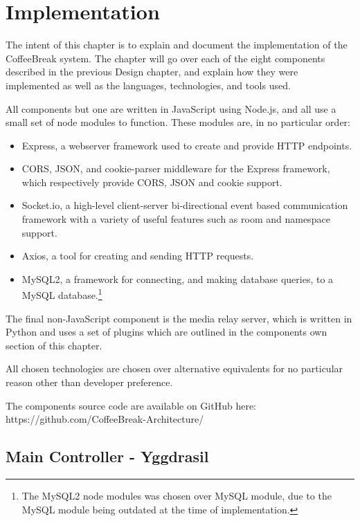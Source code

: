 \chapter{Implementation}

The intent of this chapter is to explain and document the implementation of the CoffeeBreak system. The chapter will go over each of the eight components described in the previous Design chapter, and explain how they were implemented as well as the languages, technologies, and tools used.

All components but one are written in JavaScript using Node.js, and all use a small set of node modules to function. These modules are, in no particular order:

\begin{itemize}
    \item Express, a webserver framework used to create and provide HTTP endpoints.\cite{express}
    \item CORS\cite{expresscors}, JSON\cite{expressapi}, and cookie-parser\cite{expresscookies} middleware for the Express framework, which respectively provide CORS, JSON and cookie support.
    \item Socket.io, a high-level client-server bi-directional event based communication framework with a variety of useful features such as room and namespace support.\cite{socketio}
    \item Axios, a tool for creating and sending HTTP requests.\cite{axios}
    \item MySQL2, a framework for connecting, and making database queries, to a MySQL database.\footnote{The MySQL2 node modules was chosen over MySQL module, due to the MySQL module being outdated at the time of implementation.}\cite{mysql2}
\end{itemize}

The final non-JavaScript component is the media relay server, which is written in Python and uses a set of plugins which are outlined in the components own section of this chapter.

All chosen technologies are chosen over alternative equivalents for no particular reason other than developer preference.

The components source code are available on GitHub here: https://github.com/CoffeeBreak-Architecture/\cite{sourcecode}

\section{Main Controller - Yggdrasil}

